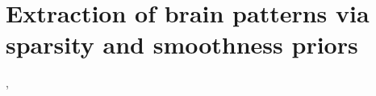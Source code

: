 \chapter{Extraction of brain patterns via sparsity and smoothness priors}\label{chap:stats_fmri}
\label{Chapter_2}



\vspace*{\fill}
,%







